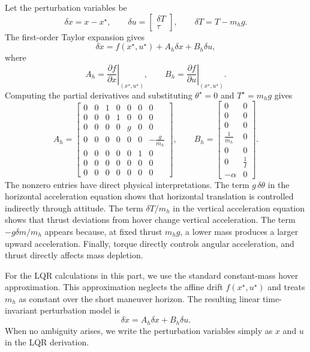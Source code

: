 Let the perturbation variables be
\[
    \delta x = x-x^\star,
    \qquad
    \delta u =
    \begin{bmatrix}
        \delta T \\
        \tau
    \end{bmatrix},
    \qquad
    \delta T = T-m_hg.
\]
The first-order Taylor expansion gives
\[
    \delta \dot x
    = f(x^\star,u^\star) + A_h \delta x + B_h \delta u,
\]
where
\[
    A_h = \left.\frac{\partial f}{\partial x}\right|_{(x^\star,u^\star)},
    \qquad
    B_h = \left.\frac{\partial f}{\partial u}\right|_{(x^\star,u^\star)}.
\]
Computing the partial derivatives and substituting $\theta^\star=0$ and $T^\star=m_hg$ gives
\[
A_h =
\begin{bmatrix}
0 & 0 & 1 & 0 & 0 & 0 & 0 \\
0 & 0 & 0 & 1 & 0 & 0 & 0 \\
0 & 0 & 0 & 0 & g & 0 & 0 \\
0 & 0 & 0 & 0 & 0 & 0 & -\frac{g}{m_h} \\
0 & 0 & 0 & 0 & 0 & 1 & 0 \\
0 & 0 & 0 & 0 & 0 & 0 & 0 \\
0 & 0 & 0 & 0 & 0 & 0 & 0
\end{bmatrix},
\qquad
B_h =
\begin{bmatrix}
0 & 0 \\
0 & 0 \\
0 & 0 \\
\frac{1}{m_h} & 0 \\
0 & 0 \\
0 & \frac{1}{I} \\
-\alpha & 0
\end{bmatrix}.
\]
The nonzero entries have direct physical interpretations.  The term $g\,\delta\theta$ in the horizontal acceleration equation shows that horizontal translation is controlled indirectly through attitude.  The term $\delta T/m_h$ in the vertical acceleration equation shows that thrust deviations from hover change vertical acceleration.  The term $-g\delta m/m_h$ appears because, at fixed thrust $m_hg$, a lower mass produces a larger upward acceleration.  Finally, torque directly controls angular acceleration, and thrust directly affects mass depletion.

For the LQR calculations in this part, we use the standard constant-mass hover approximation.  This approximation neglects the affine drift $f(x^\star,u^\star)$ and treats $m_h$ as constant over the short maneuver horizon.  The resulting linear time-invariant perturbation model is
\[
    \delta \dot x = A_h \delta x + B_h \delta u.
\]
When no ambiguity arises, we write the perturbation variables simply as $x$ and $u$ in the LQR derivation.

